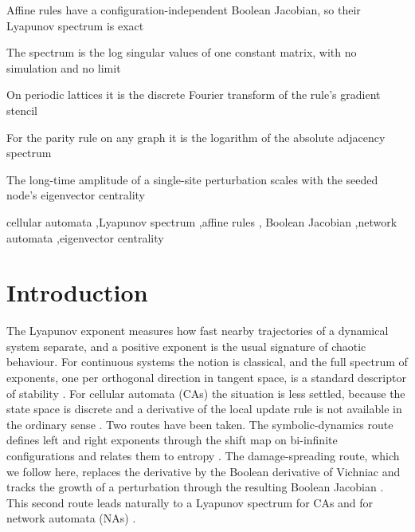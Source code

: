 \documentclass[a4paper,fleqn]{cas-dc}
\begin{document}
\begin{highlights}
    \item Affine rules have a configuration-independent Boolean Jacobian, so their Lyapunov spectrum is exact
    \item The spectrum is the log singular values of one constant matrix, with no simulation and no limit
    \item On periodic lattices it is the discrete Fourier transform of the rule's gradient stencil
    \item For the parity rule on any graph it is the logarithm of the absolute adjacency spectrum
    \item The long-time amplitude of a single-site perturbation scales with the seeded node's eigenvector centrality
\end{highlights}

\begin{keywords}
cellular automata \sep Lyapunov spectrum \sep affine rules \sep
Boolean Jacobian \sep network automata \sep eigenvector centrality
\end{keywords}

\maketitle

\section{Introduction}
\label{sec:intro}

The Lyapunov exponent measures how fast nearby trajectories of a dynamical system separate, and a positive exponent is the usual signature of chaotic behaviour. For continuous systems the notion is classical, and the full spectrum of exponents, one per orthogonal direction in tangent space, is a standard descriptor of stability \cite{eckmann1985ergodic}. For cellular automata (CAs) the situation is less settled, because the state space is discrete and a derivative of the local update rule is not available in the ordinary sense \cite{rollier2025comprehensive}. Two routes have been taken. The symbolic-dynamics route defines left and right exponents through the shift map on bi-infinite configurations and relates them to entropy \cite{shereshevsky1992lyapunov,tisseur2000cellular}. The damage-spreading route, which we follow here, replaces the derivative by the Boolean derivative of Vichniac \cite{vichniac1990boolean} and tracks the growth of a perturbation through the resulting Boolean Jacobian \cite{bagnoli1992damage,bagnoli1999synchronization}. This second route leads naturally to a Lyapunov spectrum for CAs and for network automata (NAs) \cite{baetens2016stability,baetens2018lyapunov,vispoel2024damage}.
\end{document}
